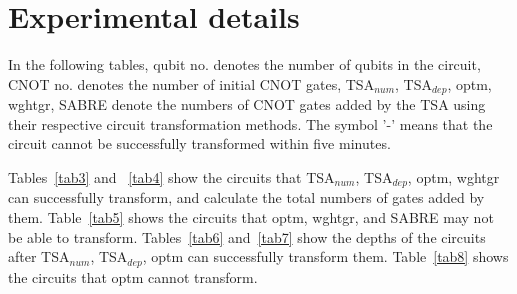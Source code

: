\documentclass[journal]{IEEEtran}
\begin{document}


\newpage
\appendix
\section*{Experimental details} %
In the following tables, qubit no. denotes the number of qubits in the circuit, CNOT no. denotes the number of initial CNOT gates, TSA$_{num}$, TSA$_{dep}$, optm, wghtgr, SABRE denote the numbers of CNOT gates added by the TSA using their respective circuit transformation methods. %
The symbol '-' means that the circuit cannot be successfully transformed within five minutes.

Tables~\ref{tab3} and ~\ref{tab4} show the circuits that TSA$_{num}$, TSA$_{dep}$, optm, wghtgr can successfully transform, and calculate the total numbers of gates added by them. Table~\ref{tab5} shows the circuits that optm, wghtgr, and SABRE may not be able to transform. Tables~\ref{tab6} and~\ref{tab7} show the depths of the circuits after TSA$_{num}$, TSA$_{dep}$, optm can successfully transform them.  Table~\ref{tab8} shows the circuits that optm cannot transform.
\end{document}

